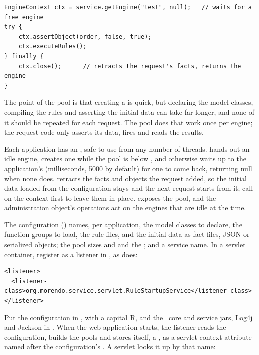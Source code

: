 \begin{lstlisting}[style=java]
EngineContext ctx = service.getEngine("test", null);   // waits for a free engine
try {
    ctx.assertObject(order, false, true);
    ctx.executeRules();
} finally {
    ctx.close();      // retracts the request's facts, returns the engine
}
\end{lstlisting}

The point of the pool is that creating a  is quick, but
declaring the model classes, compiling the rules and asserting the
initial data can take far longer, and none of it should be repeated for
each request. The pool does that work once per engine; the request code
only asserts its data, fires and reads the results.

Each application has an , safe to use from any number of
threads.  hands out an idle engine, creates one while the
pool is below , and otherwise waits up to the application's
 (milliseconds, 5000 by default) for one to come
back, returning null when none does.  retracts the facts and
objects the request added, so the initial data loaded from the
configuration stays and the next request starts from it; call
 on the context first to leave them in place.
 exposes the pool, and the
administration object's  operations act on the engines that
are idle at the time.

The configuration ()
names, per application, the model classes to declare, the function
groups to load, the rule files, and the initial data as fact files, JSON
or serialized objects; the pool sizes  and
 and the ; and a service name. In a servlet
container, register 
as a listener in , as 
does:

\begin{lstlisting}[style=shell]
<listener>
  <listener-class>org.morendo.service.servlet.RuleStartupService</listener-class>
</listener>
\end{lstlisting}

Put the configuration in , with a capital
R, and the \Morendo\ core and service jars, Log4j and Jackson in
. When the web application starts, the listener reads
the configuration, builds the pools and stores itself, a
, as a servlet-context attribute named after the
configuration's . A servlet looks it up by that name:

